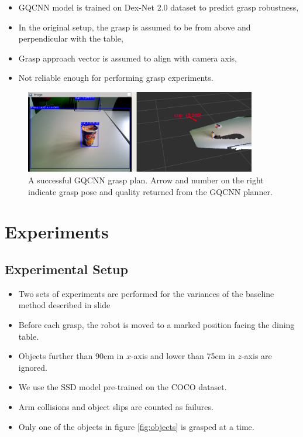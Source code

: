 \documentclass[runningheads]{../llncs}
\begin{document}
\begin{itemize}
    \item GQCNN model \cite{mahler2017} is trained on Dex-Net 2.0 dataset to predict grasp robustness,
    \item In the original setup, the grasp is assumed to be from above and perpendicular with the table,
    \item Grasp approach vector is assumed to align with camera axis,
    \item Not reliable enough for performing grasp experiments.
\end{itemize}

\begin{figure}[h!]
    \centering
    \includegraphics[width=0.9\textwidth]{grasp_gqcnn_result}
    \caption{A successful GQCNN grasp plan. Arrow and number on the right indicate grasp pose and quality returned from
             the GQCNN planner.}
    \label{fig:gqcnn_result}
\end{figure}

\section{Experiments}

\subsection{Experimental Setup}

\begin{itemize}
    \item Two sets of experiments are performed for the variances of the baseline method described in slide
    \item Before each grasp, the robot is moved to a marked position facing the dining table.
    \item Objects further than 90cm in $ x $-axis and lower than 75cm in $ z $-axis are ignored.
    \item We use the SSD model pre-trained on the COCO dataset.
    \item Arm collisions and object slips are counted as failures.
    \item Only one of the objects in figure \ref{fig:objects} is grasped at a time.
\end{itemize}
\end{document}
